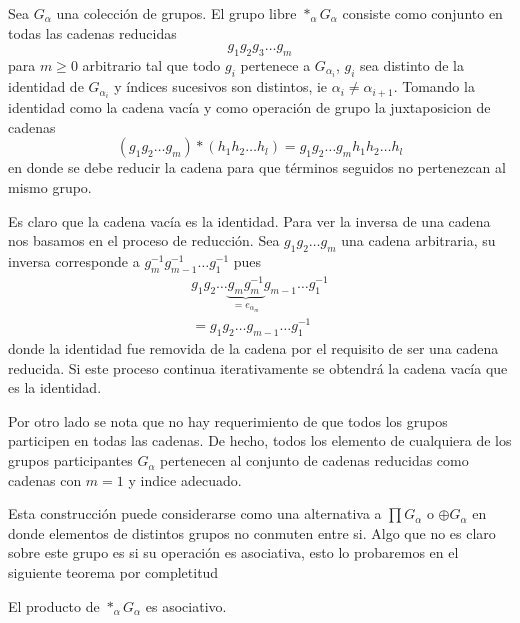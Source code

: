 \begin{definicion}
  Sea \(G_\alpha\) una colección de grupos. El grupo libre \(*_\alpha
  G_\alpha \) consiste como conjunto en todas las cadenas reducidas
  \[ g_1 g_2 g_3 \dots g_m \]
  para \(m \geq 0\) arbitrario tal que todo \(g_i\) pertenece a
  \(G_{\alpha_i}\), \(g_i\) sea distinto de la identidad de
  \(G_{\alpha_i}\) y índices sucesivos son distintos, ie \(\alpha_i \neq
  \alpha_{i + 1}\). Tomando la identidad como la cadena vacía y como
  operación de grupo la juxtaposicion de cadenas
  \[ (g_1 g_2 \dots g_m ) * (h_1 h_2 \dots h_l) = g_1 g_2 \dots g_m
    h_1 h_2 \dots h_l \]
  en donde se debe reducir la cadena para que términos seguidos no
  pertenezcan al mismo grupo.
\end{definicion}
\begin{acotacion}
  Es claro que la cadena vacía es la identidad. Para ver la inversa de
  una cadena nos basamos en el proceso de reducción. Sea \(g_1 g_2 \dots
  g_m\) una cadena arbitraria, su inversa corresponde a \(g_m^{-1} g_{m-1}^{-1}
  \dots g_1^{-1}\) pues
  \begin{gather*}
    g_1 g_2 \dots \underbrace{g_m g_m^{-1}}_{= e_{\alpha_m}}
      g_{m-1} \dots g_1^{-1} \\
    = g_1 g_2 \dots g_{m-1} \dots g_1^{-1}
  \end{gather*}
  donde la identidad fue removida de la cadena por el requisito de ser
  una cadena reducida. Si este proceso continua iterativamente se
  obtendrá la cadena vacía que es la identidad.

  Por otro lado se nota que no hay requerimiento de que todos los grupos
  participen en todas las cadenas. De hecho, todos los elemento de
  cualquiera de los grupos participantes \(G_\alpha\) pertenecen al
  conjunto de cadenas reducidas como cadenas con \(m = 1\) y indice
  adecuado.
\end{acotacion}
Esta construcción puede considerarse como una alternativa a \(\prod
G_\alpha\) o \(\oplus G_\alpha\) en donde elementos de distintos grupos
no conmuten entre si. Algo que no es claro sobre este grupo es si
su operación es asociativa, esto lo probaremos en el siguiente teorema
por completitud
\begin{teorema}
  El producto de \(*_\alpha G_\alpha\) es asociativo.
\end{teorema}
